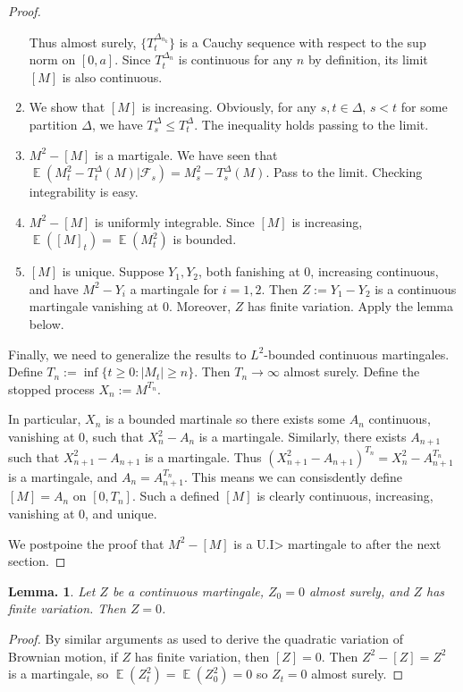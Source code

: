 \documentclass[11pt, a4paper]{memoir}
\theoremstyle{change}
\newtheorem{lemma}[theorem]{Lemma.}
\theoremstyle{plain}
\theoremstyle{nonumberplain}
\newtheorem{proof}{Proof}
\DeclareMathOperator{\E}{{\mathbb{E}}}
\numberwithin{equation}{section}
\begin{document}
\begin{proof}
\begin{enumerate}[nl]
            Thus almost surely, $\{T_t^{\Delta_{n_k}}\}$ is a Cauchy sequence with respect to the sup norm on $[0,a]$.
            Since $T_t^{\Delta_n}$ is continuous for any $n$ by definition, its limit $[M]$ is also continuous.
        \item We show that $[M]$ is increasing.
            Obviously, for any $s,t\in\Delta$, $s<t$ for some partition $\Delta$, we have $T_s^{\Delta}\leq T_t^{\Delta}$.
            The inequality holds passing to the limit.
        \item $M^2-[M]$ is a martigale.
            We have seen that $\E(M_t^2-T_t^\Delta(M)|\mathcal{F}_s)=M_s^2-T_s^\Delta(M)$.
            Pass to the limit.
            Checking integrability is easy.
        \item $M^2-[M]$ is uniformly integrable.
            Since $[M]$ is increasing, $\E([M]_t)=\E(M_t^2)$ is bounded.
        \item $[M]$ is unique.
            Suppose $Y_1,Y_2$, both fanishing at $0$, increasing continuous, and have $M^2-Y_i$ a martingale for $i=1,2$.
            Then $Z:=Y_1-Y_2$ is a continuous martingale vanishing at $0$.
            Moreover, $Z$ has finite variation.
            Apply the lemma below.
    \end{enumerate}
    Finally, we need to generalize the results to $L^2$-bounded continuous martingales.
    Define $T_n:=\inf\{t\geq 0:|M_t|\geq n\}$.
    Then $T_n\to\infty$ almost surely.
    Define the stopped process $X_n:=M^{T_n}$.

    In particular, $X_n$ is a bounded martinale so there exists some $A_n$ continuous, vanishing at $0$, such that $X_n^2-A_n$ is a martingale.
    Similarly, there exists $A_{n+1}$ such that $X_{n+1}^2-A_{n+1}$ is a martingale.
    Thus $(X_{n+1}^2-A_{n+1})^{T_n}=X_n^2-A_{n+1}^{T_n}$ is a martingale, and $A_n=A_{n+1}^{T_n}$.
    This means we can consisdently define $[M]=A_n$ on $[0,T_n]$.
    Such a defined $[M]$ is clearly continuous, increasing, vanishing at $0$, and unique.

    We postpoine the proof that $M^2-[M]$ is a U.I> martingale to after the next section.
\end{proof}
\begin{lemma}
    Let $Z$ be a continuous martingale, $Z_0=0$ almost surely, and $Z$ has finite variation.
    Then $Z=0$.
\end{lemma}
\begin{proof}
    By similar arguments as used to derive the quadratic variation of Brownian motion, if $Z$ has finite variation, then $[Z]=0$.
    Then $Z^2-[Z]=Z^2$ is a martingale, so $\E(Z_t^2)=\E(Z_0^2)=0$ so $Z_t=0$ almost surely.
\end{proof}
\end{document}
